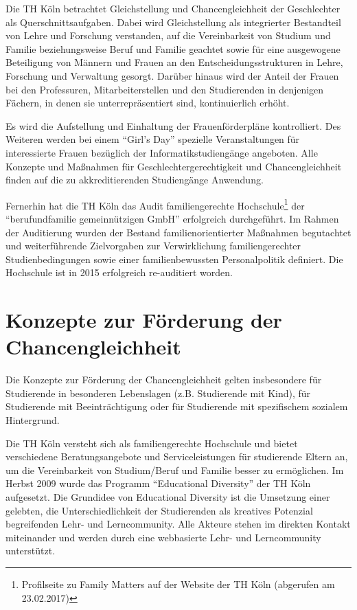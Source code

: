 Die TH Köln betrachtet Gleichstellung und Chancengleichheit der
Geschlechter als Querschnittsaufgaben. Dabei wird Gleichstellung als
integrierter Bestandteil von Lehre und Forschung verstanden, auf die
Vereinbarkeit von Studium und Familie beziehungsweise Beruf und Familie
geachtet sowie für eine ausgewogene Beteiligung von Männern und Frauen
an den Entscheidungsstrukturen in Lehre, Forschung und Verwaltung
gesorgt. Darüber hinaus wird der Anteil der Frauen bei den Professuren,
Mitarbeiterstellen und den Studierenden in denjenigen Fächern, in denen
sie unterrepräsentiert sind, kontinuierlich erhöht.

Es wird die Aufstellung und Einhaltung der Frauenförderpläne
kontrolliert. Des Weiteren werden bei einem ``Girl's Day'' spezielle
Veranstaltungen für interessierte Frauen bezüglich der
Informatikstudiengänge angeboten. Alle Konzepte und Maßnahmen für
Geschlechtergerechtigkeit und Chancengleichheit finden auf die zu
akkreditierenden Studiengänge Anwendung.

Fernerhin hat die TH Köln das Audit familiengerechte
Hochschule\footnote{ Profilseite zu Family Matters auf der Website der
  TH Köln (abgerufen am 23.02.2017)} der ``berufundfamilie
gemeinnützigen GmbH'' erfolgreich durchgeführt. Im Rahmen der
Auditierung wurden der Bestand familienorientierter Maßnahmen
begutachtet und weiterführende Zielvorgaben zur Verwirklichung
familiengerechter Studienbedingungen sowie einer familienbewussten
Personalpolitik definiert. Die Hochschule ist in 2015 erfolgreich
re-auditiert worden.

\section{Konzepte zur Förderung der
Chancengleichheit}\label{konzepte-zur-fuxf6rderung-der-chancengleichheit}

Die Konzepte zur Förderung der Chancengleichheit gelten insbesondere für
Studierende in besonderen Lebenslagen (z.B. Studierende mit Kind), für
Studierende mit Beeinträchtigung oder für Studierende mit spezifischem
sozialem Hintergrund.

Die TH Köln versteht sich als familiengerechte Hochschule und bietet
verschiedene Beratungsangebote und Serviceleistungen für studierende
Eltern an, um die Vereinbarkeit von Studium/Beruf und Familie besser zu
ermöglichen. Im Herbst 2009 wurde das Programm ``Educational Diversity''
der TH Köln aufgesetzt. Die Grundidee von Educational Diversity ist die
Umsetzung einer gelebten, die Unterschiedlichkeit der Studierenden als
kreatives Potenzial begreifenden Lehr- und Lerncommunity. Alle Akteure
stehen im direkten Kontakt miteinander und werden durch eine webbasierte
Lehr- und Lerncommunity unterstützt.

